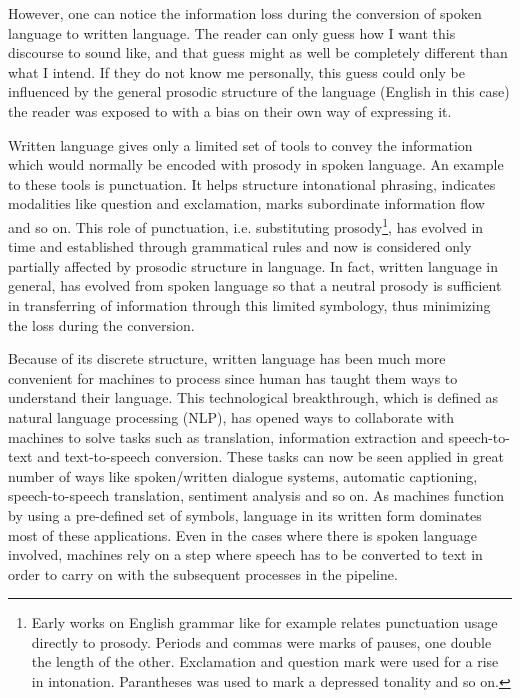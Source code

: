 However, one can notice the information loss during the conversion of spoken language to written language. The reader can only guess how I want this discourse to sound like, and that guess might as well be completely different than what I intend. If they do not know me personally, this guess could only be influenced by the general prosodic structure of the language (English in this case) the reader was exposed to with a bias on their own way of expressing it. 

Written language gives only a limited set of tools to convey the information which would normally be encoded with prosody in spoken language. An example to these tools is punctuation. It helps structure intonational phrasing, indicates modalities like question and exclamation, marks subordinate information flow and so on. This role of punctuation, i.e. substituting prosody\footnote{Early works on English grammar like \cite{lowth} for example relates punctuation usage directly to prosody. Periods and commas were marks of pauses, one double the length of the other. Exclamation and question mark were used for a rise in intonation. Parantheses was used to mark a depressed tonality and so on.}, has evolved in time and established through grammatical rules and now is considered only partially affected by prosodic structure in language. In fact, written language in general, has evolved from spoken language so that a neutral prosody is sufficient in transferring of information through this limited symbology, thus minimizing the loss during the conversion. 

Because of its discrete structure, written language has been much more convenient for machines to process since human has taught them ways to understand their language. This technological breakthrough, which is defined as natural language processing (NLP), has opened ways to collaborate with machines to solve tasks such as translation, information extraction and speech-to-text and text-to-speech conversion. These tasks can now be seen applied in great number of ways like spoken/written dialogue systems, automatic captioning, speech-to-speech translation, sentiment analysis and so on. As machines function by using a pre-defined set of symbols, language in its written form dominates most of these applications. Even in the cases where there is spoken language involved, machines rely on a step where speech has to be converted to text in order to carry on with the subsequent processes in the pipeline. 

